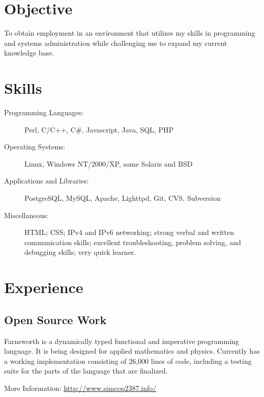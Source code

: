 \documentclass[table]{resume}
\author{Ryan Voots}
\begin{document}
\maketitle
\vspace{0.1in}

\section{Objective}
To obtain employment in an environment that utilizes my skills in programming and systems administration while challenging me to
expand my current knowledge base.

\section{Skills}
\begin{description}
\item[Programming Languages:]
Perl, C/C++, C\#, Javascript, Java, SQL, PHP
\item[Operating Systems:]
Linux, Windows NT/2000/XP, some Solaris and BSD
\item[Applications and Libraries:]
PostgreSQL, MySQL, Apache, Lighttpd, Git, CVS, Subversion
\item[Miscellaneous:]
HTML; CSS; IPv4 and IPv6 networking; strong verbal and written communication skills; excellent troubleshooting, problem solving, and debugging skills; very quick learner.
\end{description}

\section{Experience}

\subsection{Open Source Work}


\begin{compactitem}
\item Farnsworth is a dynamically typed functional and imperative programming language.  
It is being designed for applied mathematics and physics.  Currently has a working implementation 
consisting of 26,000 lines of code, including a testing suite for the parts of the language that are finalized.
\item More Information: \url{http://www.simcop2387.info/}
\end{compactitem}
\end{document}
